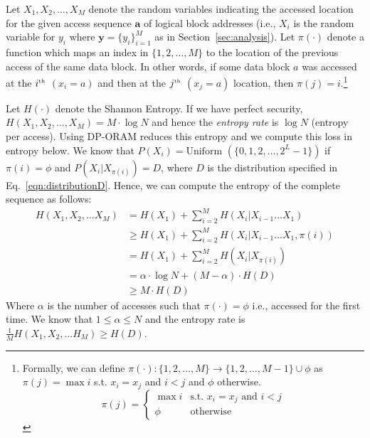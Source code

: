 \documentclass[USenglish,oneside,twocolumn]{article}
\begin{document}
Let $X_1, X_2, \hdots , X_M$ denote the random variables indicating the accessed location for the given access sequence $\textbf{a}$ of logical block addresses (i.e., $X_i$ is the random variable for $y_i$ where $\textbf{y} = \{ y_i \}_{i=1}^M$ as in Section~\ref{sec:analysis}). Let $\pi(\cdot)$ denote a function which maps an index in $\{1,2, \hdots , M\}$ to the location of the previous access of the same data block. 
In other words, if some data block $a$ was accessed at the $i^{{\tiny \mbox{th}}}$ $(x_i = a)$ and then at the $j^{{\tiny \mbox{th}}}$ $(x_j = a)$ location, then $\pi(j) = i$.\footnote{Formally, we can define $\pi(\cdot): \{1,2, \hdots , M\} \to \{1,2, \hdots , M-1\} \cup \phi $ as $\pi(j) = \max i$ s.t. $x_i = x_j$ and $i < j$ and $\phi$ otherwise.
\begin{equation*}
\pi(j) = 
\begin{cases}
\max i & \text{s.t. $x_i = x_j$ and $i < j$}\\
\phi	& \text{otherwise}
\end{cases}
\end{equation*}
}


Let $H(\cdot)$ denote the Shannon Entropy. If we have perfect security, $H(X_1, X_2, \hdots , X_M) = M \cdot \log N$ and 
hence the \textit{entropy rate} is $\log N$ (entropy per access). Using DP-ORAM reduces this entropy and we compute this loss in entropy below. We know that $P(X_i) = \textrm{Uniform $(\{0,1,2, \hdots , 2^L-1 \})$}$ if $\pi(i) = \phi$ and $P(X_i | X_{\pi(i)}) = D$, where $D$ is the distribution specified in Eq.~\ref{eqn:distributionD}. Hence, we can compute the entropy of the complete sequence as follows:
\begin{align*}
H(X_1, X_2, \hdots X_M) &= H(X_1) + \sum\limits_{i=2}^M H(X_i | X_{i-1} \hdots X_1) \\
&\geq H(X_1) + \sum\limits_{i=2}^M H(X_i | X_{i-1} \hdots X_1, \pi(i)) \\
&= H(X_1) + \sum\limits_{i=2}^M H(X_i | X_{\pi(i)}) \\
&= \alpha \cdot \log N + (M-\alpha) \cdot H(D) \\
&\geq M \cdot H(D)
\end{align*}
Where $\alpha$ is the number of accesses such that $\pi(\cdot) = \phi$ i.e., accessed for the first time. We know that $1 \leq \alpha \leq N$ and the entropy rate is $\frac{1}{M} H(X_1, X_2, \hdots H_M) \geq H(D)$.
\end{document}
